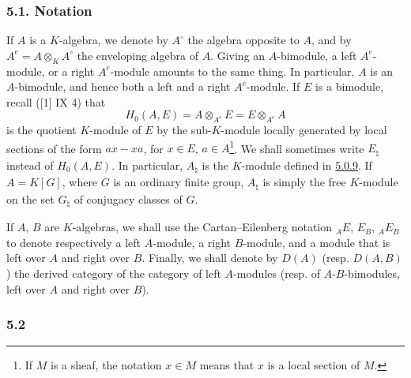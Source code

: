 \documentclass[11pt]{article}
\begin{document}
\subsubsection*{5.1. Notation}\label{sga5:IIIB:subsubsection:5.1}

If $A$ is a $K$-algebra, we denote by $A^\circ$ the algebra opposite to $A$, and by $A^e=A\otimes_KA^\circ$ the enveloping algebra of $A$. Giving an $A$-bimodule, a left $A^e$-module, or a right $A^e$-module amounts to the same thing. In particular, $A$ is an $A$-bimodule, and hence both a left and a right $A^e$-module. If $E$ is a bimodule, recall ([1] IX 4) that
\[
H_0(A,E)=A\otimes_{A^e}E=E\otimes_{A^e}A
\]
is the quotient $K$-module of $E$ by the sub-$K$-module locally generated by local sections of the form $ax-xa$, for $x\in E$, $a\in A$\footnote{If $M$ is a sheaf, the notation $x\in M$ means that $x$ is a local section of $M$.}. We shall sometimes write $E_\natural$ instead of $H_0(A,E)$. In particular, $A_\natural$ is the $K$-module defined in \hyperref[sga5:IIIB:equation:5.0.9]{5.0.9}. If $A=K[G]$, where $G$ is an ordinary finite group, $A_\natural$ is simply the free $K$-module on the set $G_\natural$ of conjugacy classes of $G$.

If $A$, $B$ are $K$-algebras, we shall use the Cartan--Eilenberg notation ${}_AE$, $E_B$, ${}_AE_B$ to denote respectively a left $A$-module, a right $B$-module, and a module that is left over $A$ and right over $B$. Finally, we shall denote by $D(A)$ (resp. $D(A,B)$) the derived category of the category of left $A$-modules (resp. of $A$-$B$-bimodules, left over $A$ and right over $B$).

\subsubsection*{5.2}\label{sga5:IIIB:subsubsection:5.2}
\end{document}
